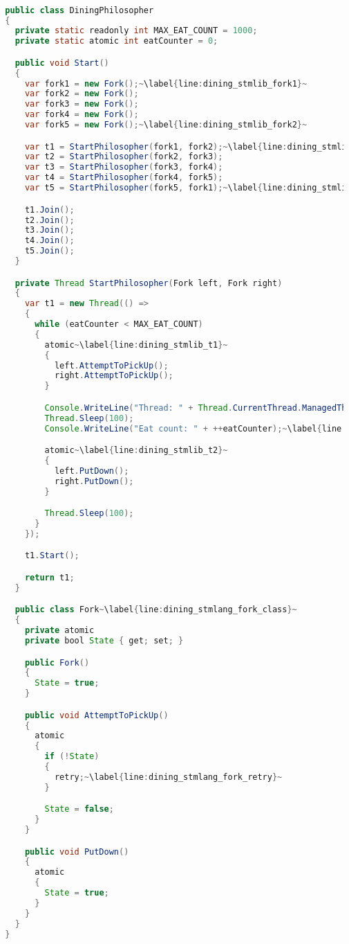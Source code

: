 \begin{lstlisting}[label=lst:impl_dining_lang,
  caption={\stmname Based Dining Philosophers Implementation},
  language=Java,  
  showspaces=false,
  showtabs=false,
  breaklines=true,
  showstringspaces=false,
  breakatwhitespace=true,
  commentstyle=\color{greencomments},
  keywordstyle=\color{bluekeywords},
  stringstyle=\color{redstrings},
  escapechar=~,
  morekeywords={atomic, retry, orelse, var, get, set, ref, out, readonly, virtual, override, region, endregion, foreach, lock}]  % Start your code-block

  public class DiningPhilosopher
  {
    private static readonly int MAX_EAT_COUNT = 1000;
    private static atomic int eatCounter = 0;

    public void Start()
    {
      var fork1 = new Fork();~\label{line:dining_stmlib_fork1}~
      var fork2 = new Fork();
      var fork3 = new Fork();
      var fork4 = new Fork();
      var fork5 = new Fork();~\label{line:dining_stmlib_fork2}~

      var t1 = StartPhilosopher(fork1, fork2);~\label{line:dining_stmlib_fork_pass1}~
      var t2 = StartPhilosopher(fork2, fork3);
      var t3 = StartPhilosopher(fork3, fork4);
      var t4 = StartPhilosopher(fork4, fork5);
      var t5 = StartPhilosopher(fork5, fork1);~\label{line:dining_stmlib_fork_pass2}~

      t1.Join();
      t2.Join();
      t3.Join();
      t4.Join();
      t5.Join();
    }

    private Thread StartPhilosopher(Fork left, Fork right)
    {
      var t1 = new Thread(() =>
      {
        while (eatCounter < MAX_EAT_COUNT)
        {
          atomic~\label{line:dining_stmlib_t1}~
          {
            left.AttemptToPickUp();
            right.AttemptToPickUp();
          }

          Console.WriteLine("Thread: " + Thread.CurrentThread.ManagedThreadId + " eating.");~\label{line:dining_stmlib_eat1}~
          Thread.Sleep(100);
          Console.WriteLine("Eat count: " + ++eatCounter);~\label{line:dining_stmlib_eat2}~

          atomic~\label{line:dining_stmlib_t2}~
          {
            left.PutDown();
            right.PutDown();
          }

          Thread.Sleep(100);
        }
      });

      t1.Start();

      return t1;
    }

    public class Fork~\label{line:dining_stmlang_fork_class}~
    {
      private atomic 
      private bool State { get; set; }

      public Fork()
      {
        State = true;
      }

      public void AttemptToPickUp()
      {
        atomic
        {
          if (!State)
          {
            retry;~\label{line:dining_stmlang_fork_retry}~
          }

          State = false;
        }
      }

      public void PutDown()
      {
        atomic
        {
          State = true;
        }
      }
    }
  }

\end{lstlisting}
